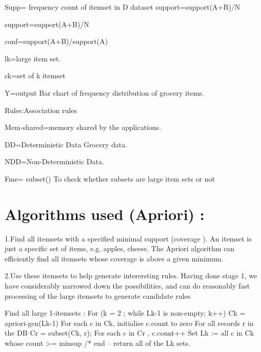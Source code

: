 \documentclass[a4paper,12pt]{article}
\begin{document}
{\rmfamily
	Supp= frequency count of itemset in D dataset
	support=support(A+B)/N
	}

{\rmfamily
	support=support(A+B)/N
}

{\rmfamily
	conf=support(A+B)/support(A)
	
{\rmfamily
lk=large item set.	
	}
	
	{\rmfamily
		ck=set of k itemset
	}
	
	{\rmfamily
Y=output
Bar chart of frequency distribution of grocery items.

	{\rmfamily
	
 Rules:Association rules
 
}
{\rmfamily
		Mem-shared=memory shared by the applications.}
	
{\rmfamily
		DD=Deterministic Data
		Grocery data.
}
	
	{\rmfamily
NDD=Non-Deterministic Data.}

{\rmfamily
Fme= subset()
To check whether subsets are large item sets or not
}
	
	
	
	\bigskip

\section{Algorithms used (Apriori) : }

  1.Find all itemsets with a specified minimal support  (coverage ).
\newline 
An itemset is just a specific set of items, e.g. {apples, cheese}. The Apriori algorithm can efficiently find all itemsets whose coverage is above a given minimum.

2.Use these itemsets to help generate interersting rules.
\newline
Having done stage 1, we have considerably narrowed down the possibilities, and can do reasonably fast processing of the large itemsets to generate candidate rules

Find all large 1-itemsets
:  For (k = 2 ; while Lk-1 is non-empty; k++)
		{Ck = apriori-gen(Lk-1)
          For each c in Ck, initialise c.count to zero 
          For all records r in the DB
	{Cr = subset(Ck, r);  For each c in Cr , c.count++ }
             Set Lk := all c in Ck whose count >=  minsup
         }  /*  end   -- return all of the Lk sets.


}}
\end{document}
